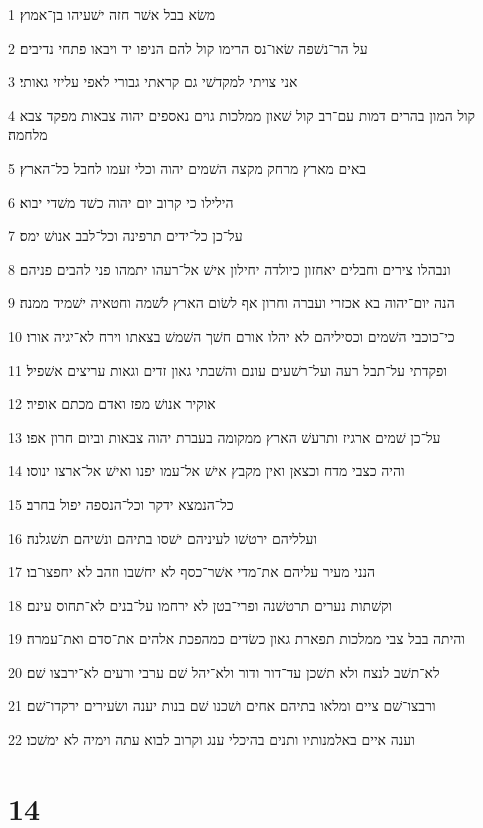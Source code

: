 \par 1 משׂא בבל אשׁר חזה ישׁעיהו בן־אמוץ׃
\par 2 על הר־נשׁפה שׂאו־נס הרימו קול להם הניפו יד ויבאו פתחי נדיבים׃
\par 3 אני צויתי למקדשׁי גם קראתי גבורי לאפי עליזי גאותי׃
\par 4 קול המון בהרים דמות עם־רב קול שׁאון ממלכות גוים נאספים יהוה צבאות מפקד צבא מלחמה׃
\par 5 באים מארץ מרחק מקצה השׁמים יהוה וכלי זעמו לחבל כל־הארץ׃
\par 6 הילילו כי קרוב יום יהוה כשׁד משׁדי יבוא׃
\par 7 על־כן כל־ידים תרפינה וכל־לבב אנושׁ ימס׃
\par 8 ונבהלו צירים וחבלים יאחזון כיולדה יחילון אישׁ אל־רעהו יתמהו פני להבים פניהם׃
\par 9 הנה יום־יהוה בא אכזרי ועברה וחרון אף לשׂום הארץ לשׁמה וחטאיה ישׁמיד ממנה׃
\par 10 כי־כוכבי השׁמים וכסיליהם לא יהלו אורם חשׁך השׁמשׁ בצאתו וירח לא־יגיה אורו׃
\par 11 ופקדתי על־תבל רעה ועל־רשׁעים עונם והשׁבתי גאון זדים וגאות עריצים אשׁפיל׃
\par 12 אוקיר אנושׁ מפז ואדם מכתם אופיר׃
\par 13 על־כן שׁמים ארגיז ותרעשׁ הארץ ממקומה בעברת יהוה צבאות וביום חרון אפו׃
\par 14 והיה כצבי מדח וכצאן ואין מקבץ אישׁ אל־עמו יפנו ואישׁ אל־ארצו ינוסו׃
\par 15 כל־הנמצא ידקר וכל־הנספה יפול בחרב׃
\par 16 ועלליהם ירטשׁו לעיניהם ישׁסו בתיהם ונשׁיהם תשׁגלנה׃
\par 17 הנני מעיר עליהם את־מדי אשׁר־כסף לא יחשׁבו וזהב לא יחפצו־בו׃
\par 18 וקשׁתות נערים תרטשׁנה ופרי־בטן לא ירחמו על־בנים לא־תחוס עינם׃
\par 19 והיתה בבל צבי ממלכות תפארת גאון כשׂדים כמהפכת אלהים את־סדם ואת־עמרה׃
\par 20 לא־תשׁב לנצח ולא תשׁכן עד־דור ודור ולא־יהל שׁם ערבי ורעים לא־ירבצו שׁם׃
\par 21 ורבצו־שׁם ציים ומלאו בתיהם אחים ושׁכנו שׁם בנות יענה ושׂעירים ירקדו־שׁם׃
\par 22 וענה איים באלמנותיו ותנים בהיכלי ענג וקרוב לבוא עתה וימיה לא ימשׁכו׃

\chapter{14}

